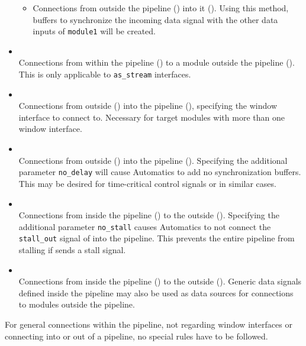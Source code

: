 \begin{itemize}
\begin{itemize}
	\item Connections from outside the pipeline () into it ().
	Using this method, buffers to synchronize the incoming data signal with the other data inputs of  \texttt{module1} will be created.
	\end{itemize}
\item {}\\
	Connections from within the pipeline () to a module outside the pipeline ().
	This is only applicable to \texttt{as\_stream} interfaces.
\item {}\\
	Connections from outside () into the pipeline (), specifying the window interface to connect to.
	Necessary for target modules with more than one window interface.
\item {}\\
	Connections from outside () into the pipeline ().
	Specifying the additional parameter \texttt{no\_delay} will cause Automatics to add no synchronization buffers.
	This may be desired for time-critical control signals or in similar cases.
\item {}\\
	Connections from inside the pipeline () to the outside ().
	Specifying the additional parameter \texttt{no\_stall} causes Automatics to not connect the \texttt{stall\_out} signal of  into the pipeline.
	This prevents the entire pipeline from stalling if  sends a stall signal.
\item {}\\
	Connections from inside the pipeline () to the outside ().
	Generic data signals defined inside the pipeline may also be used as data sources for connections to modules outside the pipeline.
\end{itemize}

For general connections within the pipeline, not regarding window interfaces or connecting into or out of a pipeline, no special rules have to be followed.


